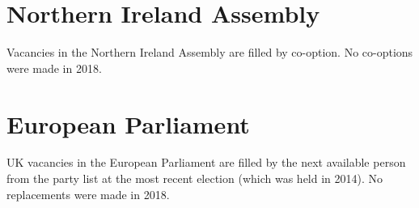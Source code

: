 \documentclass[a4paper,openany]{book}
\begin{document}
\section{Northern Ireland Assembly}

Vacancies in the Northern Ireland Assembly are filled by co-option.
No co-options were made in 2018.
%

\section{European Parliament}

UK vacancies in the European Parliament are filled by the next available person from the party list at the most recent election (which was held in 2014). 
No replacements were made in 2018.
\end{document}
